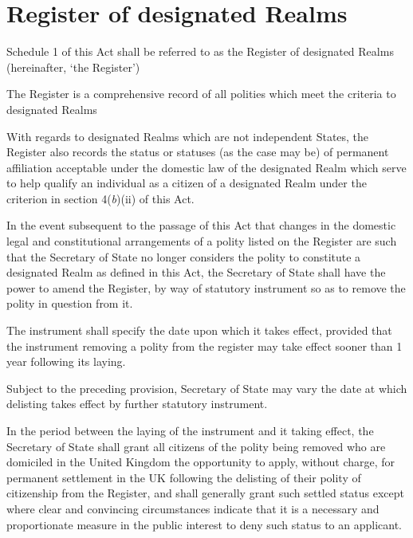 \documentclass[private]{ukbill}
\begin{document}
\section{Register of designated Realms}
\begin{numstat}
\item Schedule 1 of this Act shall be referred to as the Register of designated Realms (hereinafter, `the Register')
\begin{alphstat}
	\item The Register is a comprehensive record of all  polities which meet the criteria to designated Realms
	\item With regards to designated Realms which are not independent States, the Register also records the status or statuses (as the case may be) of permanent affiliation acceptable under the domestic law of the designated Realm which serve to help qualify an individual as a citizen of a designated Realm under the criterion in section 4(\emph{b})(ii) of this Act.
\end{alphstat}
\item  	In the event subsequent to the passage of this Act that changes in the domestic legal and constitutional arrangements of a polity listed on the Register are such that the Secretary of State no longer considers the polity to constitute a designated Realm as defined in this Act, the Secretary of State shall have the power to amend the Register, by way of statutory instrument  so as to remove the polity  in question from it.
\begin{alphstat}
	\item The instrument shall specify the date upon which it takes effect, provided that the instrument removing a polity from the register may take effect sooner than 1 year following its laying.
	\item Subject to the preceding provision, Secretary of State may vary the date at which delisting takes effect by further statutory instrument.
	\item In the period between the laying of the instrument and it taking effect, the Secretary of State shall grant all citizens of the polity being removed who are domiciled in the United Kingdom the opportunity to apply, without charge, for permanent settlement in the UK following the delisting of their polity of citizenship from the Register, and shall generally grant such settled status except where clear and convincing circumstances indicate that it is a  necessary and proportionate measure  in the public interest to deny such status to an applicant.
\end{alphstat}


\end{numstat}
\end{document}
